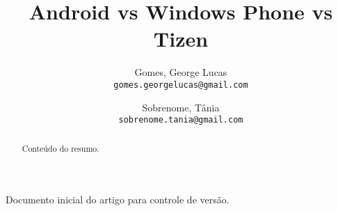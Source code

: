 \documentclass[11pt,a4paper]{article}
\author{
	Gomes, George Lucas\\
	\texttt{gomes.georgelucas@gmail.com}
	\and
	Sobrenome, Tânia\\
	\texttt{sobrenome.tania@gmail.com}
}
\title{\Huge Android vs Windows Phone vs Tizen}
\begin{document}
\maketitle
	\begin{abstract}
		Conteúdo do resumo.
	\end{abstract}

	\tableofcontents
Documento inicial do artigo para controle de versão.
\end{document}
